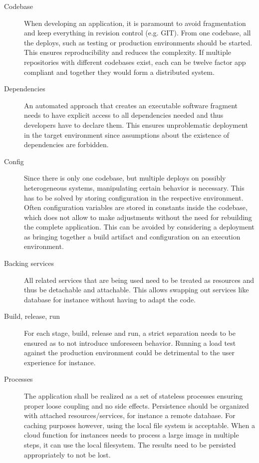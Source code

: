 \setlength{\leftmargini}{0pt} 
\begin{description}
	\item[Codebase] When developing an application, it is paramount to avoid fragmentation and keep everything in revision control (e.g. GIT). From one codebase, all the deploys, such as testing or production environments should be started. This ensures reproducibility and reduces the complexity. If multiple repositories with different codebases exist, each can be twelve factor app compliant and together they would form a distributed system.
	\item[Dependencies] An automated approach that creates an executable software fragment needs to have explicit access to all dependencies needed and thus developers have to declare them. This ensures unproblematic deployment in the target environment since assumptions about the existence of dependencies are forbidden. 
	\item[Config] Since there is only one codebase, but multiple deploys on possibly heterogeneous systems, manipulating certain behavior is necessary. This has to be solved by storing configuration in the respective environment. Often configuration variables are stored in constants inside the codebase, which does not allow to make adjustments without the need for rebuilding the complete application. This can be avoided by considering a deployment as bringing together a build artifact and configuration on an execution environment.
	\item[Backing services] All related services that are being used need to be treated as resources and thus be detachable and attachable. This allows swapping out services like database for instance without having to adapt the code. 
	\item[Build, release, run] For each stage, build, release and run, a strict separation needs to be ensured as to not introduce unforeseen behavior. Running a load test against the production environment could be detrimental to the user experience for instance. 
	\item[Processes] The application shall be realized as a set of stateless processes ensuring proper loose coupling and no side effects. Persistence should be organized with attached resources/services, for instance a remote database. For caching purposes however, using the local file system is acceptable. When a cloud function for instances needs to process a large image in multiple steps, it can use the local filesystem. The results need to be persisted appropriately to not be lost.

\end{description}
